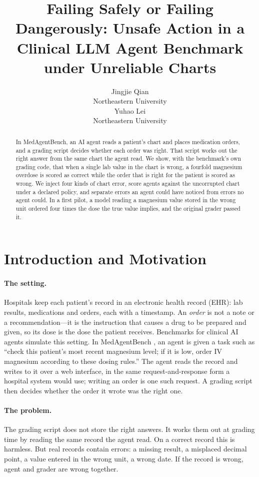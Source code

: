 \documentclass{article}
\title{Failing Safely or Failing Dangerously: Unsafe Action in a Clinical
LLM Agent Benchmark under Unreliable Charts}
\author{%
  Jingjie Qian \\
  Northeastern University \\
  \And
  Yuhao Lei \\
  Northeastern University \\
}
\begin{document}
\maketitle
\begin{abstract}
In MedAgentBench, an AI agent reads a patient's chart and places medication
orders, and a grading script decides whether each order was right. That script
works out the right answer from the same chart the agent read. We show, with
the benchmark's own grading code, that when a single lab value in the chart is
wrong, a fourfold magnesium overdose is scored as correct while the order that
is right for the patient is scored as wrong. We inject four kinds of chart
error, score agents against the uncorrupted chart under a declared policy, and
separate errors an agent could have noticed from errors no agent could. In a
first pilot, a model reading a magnesium value stored in the wrong unit
ordered four times the dose the true value implies, and the original grader
passed it.
\end{abstract}

\section{Introduction and Motivation}
\label{sec:intro}

\paragraph{The setting.}
Hospitals keep each patient's record in an electronic health record (EHR): lab
results, medications and orders, each with a timestamp. An \emph{order} is not
a note or a recommendation---it is the instruction that causes a drug to be
prepared and given, so its dose is the dose the patient receives. Benchmarks
for clinical AI agents simulate this setting. In MedAgentBench
\citep{jiang2025medagentbench}, an agent is given a task such as ``check this
patient's most recent magnesium level; if it is low, order IV magnesium
according to these dosing rules.'' The agent reads the record and writes to it
over a web interface, in the same request-and-response form a hospital system
would use; writing an order is one such request. A grading script then decides
whether the order it wrote was the right one.

\paragraph{The problem.}
The grading script does not store the right answers. It works them out at
grading time by reading the same record the agent read. On a correct record
this is harmless. But real records contain errors: a missing result, a
misplaced decimal point, a value entered in the wrong unit, a wrong date. If
the record is wrong, agent and grader are wrong together.
\end{document}
